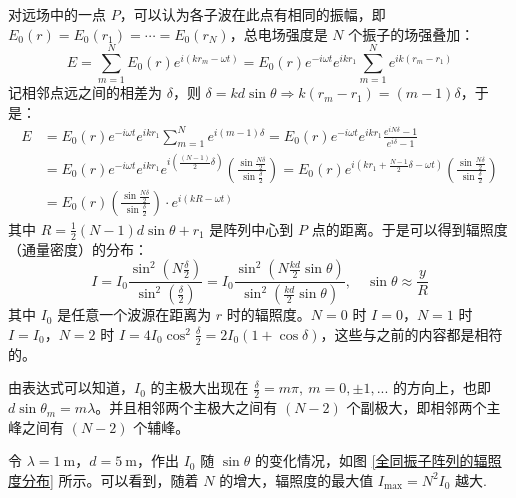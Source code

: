 \documentclass[UTF8]{report}
\theoremstyle{MyLineTheoremStyle} %
\theoremstyle{MyBlockTheoremStyle} %
\theoremstyle{MySubsubsectionStyle} %
\begin{document}
对远场中的一点 $P$，可以认为各子波在此点有相同的振幅，即 $E_0(r) = E_0(r_1) = \cdots = E_0(r_N)$，总电场强度是 $N$ 个振子的场强叠加：
\begin{equation}
E = \sum_{m=1}^{N}E_0(r) e^{i\left(kr_m - \omega t\right)} = E_0(r) e^{-i\omega t} e^{ikr_1} \sum_{m=1}^{N}e^{ik(r_m - r_1)}
\end{equation}
记相邻点远之间的相差为 $\delta$，则 $\delta = kd\sin \theta \Longrightarrow k(r_m - r_1) = (m-1)\delta$，于是：
\begin{align}
    E 
    &= E_0(r) e^{-i\omega t} e^{ikr_1} \sum_{m=1}^{N}e^{i(m-1)\delta} 
    = E_0(r) e^{-i\omega t} e^{ikr_1} \frac{e^{iN\delta} - 1}{e^{i\delta} - 1} \\ 
    &= E_0(r) e^{-i\omega t} e^{ikr_1} e^{i\left(\frac{(N-1)}{2}\delta\right)} \left(\frac{\sin \frac{N\delta}{2}}{\sin \frac{\delta}{2}}\right) 
    = E_0(r) e^{i\left(kr_1 + \frac{N - 1}{2}\delta - \omega t\right)} \left(\frac{\sin \frac{N\delta}{2}}{\sin \frac{\delta}{2}}\right) \\
    & = E_0(r)\left(\frac{\sin \frac{N\delta}{2}}{\sin \frac{\delta}{2}}\right)\cdot e^{i\left(kR - \omega t\right)}
\end{align}
其中 $R = \frac{1}{2}(N - 1)d\sin \theta + r_1$ 是阵列中心到 $P$ 点的距离。于是可以得到辐照度（通量密度）的分布：
\begin{equation}
I = I_0 \frac{\sin^2 \left(N\frac{\delta}{2}\right)}{\sin^2 \left(\frac{\delta}{2}\right)} = I_0\frac{\sin^2 \left(N \frac{kd}{2}\sin \theta \right)}{\sin^2 \left( \frac{kd}{2}\sin \theta \right)},\quad \sin \theta \approx \frac{y}{R}
\end{equation}
其中 $I_0$ 是任意一个波源在距离为 $r$ 时的辐照度。$N = 0$ 时 $I = 0$，$N = 1$ 时 $I = I_0$，$N = 2$ 时 $I = 4I_0\cos^2 \frac{\delta}{2} = 2I_0\left(1 + \cos \delta\right)$，这些与之前的内容都是相符的。

由表达式可以知道，$I_0$ 的主极大出现在 $\frac{\delta}{2} = m \pi ,\ m = 0, \pm 1, ...$ 的方向上，也即 $d \sin \theta_m = m \lambda$。并且相邻两个主极大之间有 $(N-2)$ 个副极大，即相邻两个主峰之间有 $(N-2)$ 个辅峰。

令 $\lambda = 1 \ \mathrm{m}$，$d = 5 \ \mathrm{m}$，作出 $I_0$ 随 $\sin \theta$ 的变化情况，如图 \ref{全同振子阵列的辐照度分布} 所示。可以看到，随着 $N$ 的增大，辐照度的最大值 $I_{\max} = N^2 I_0$ 越大.
\end{document}
